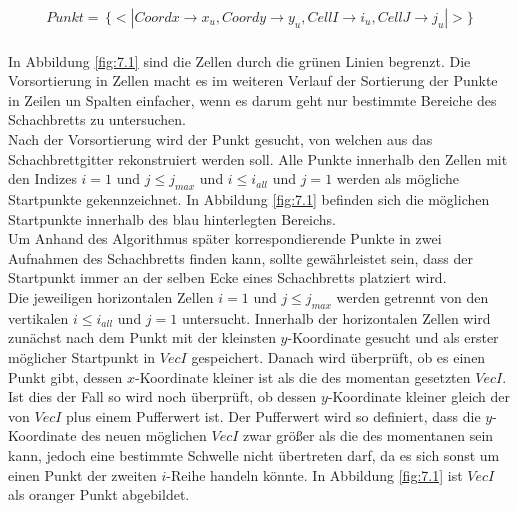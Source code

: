\begin{gather*}
	Punkt = \, \{<|Coordx \rightarrow x_u, Coordy \rightarrow y_u, CellI \rightarrow i_u, CellJ \rightarrow j_u |>\}
\end{gather*} \\

In Abbildung \ref{fig:7.1} sind die Zellen durch die grünen Linien begrenzt. Die Vorsortierung in Zellen macht es im weiteren Verlauf der Sortierung der Punkte in Zeilen un Spalten einfacher, wenn es darum geht nur bestimmte Bereiche des Schachbretts zu untersuchen.\\

Nach der Vorsortierung wird der Punkt gesucht, von welchen aus das Schachbrettgitter rekonstruiert werden soll. Alle Punkte innerhalb den Zellen mit den Indizes $i=1$ und $j \leq  j_{max}$ und $i \leq i_{all}$ und $j = 1$ werden als mögliche Startpunkte gekennzeichnet. In Abbildung \ref{fig:7.1} befinden sich die möglichen Startpunkte innerhalb des blau hinterlegten Bereichs.\\


Um Anhand des Algorithmus später korrespondierende Punkte in zwei Aufnahmen des Schachbretts finden kann, sollte gewährleistet sein, dass der Startpunkt immer an der selben Ecke eines Schachbretts platziert wird.\\

%
%
Die jeweiligen horizontalen Zellen $i=1$ und $j \leq  j_{max}$ werden getrennt von den vertikalen $i \leq i_{all}$ und $j = 1$ untersucht. Innerhalb der horizontalen Zellen wird zunächst nach dem Punkt mit der kleinsten $y$-Koordinate gesucht und als erster möglicher Startpunkt in $VecI$ gespeichert. Danach wird überprüft, ob es einen Punkt gibt, dessen $x$-Koordinate kleiner ist als die des momentan gesetzten $VecI$. Ist dies der Fall so wird noch überprüft, ob dessen $y$-Koordinate kleiner gleich der von $VecI$ plus einem Pufferwert ist. Der Pufferwert wird so definiert, dass die $y$-Koordinate des neuen möglichen $VecI$ zwar größer als die des momentanen sein kann, jedoch eine bestimmte Schwelle nicht übertreten darf, da es sich sonst um einen Punkt der zweiten $i$-Reihe handeln könnte. In Abbildung \ref{fig:7.1} ist $VecI$ als oranger Punkt abgebildet.\\

